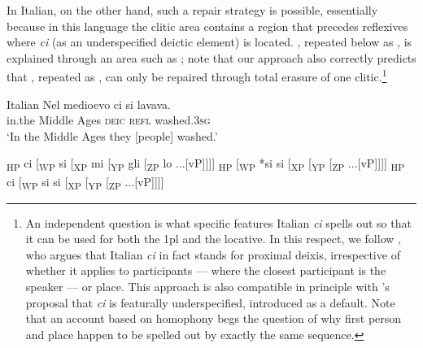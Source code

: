 \documentclass[output=paper,modfonts,nonflat,newtxmath,colorlinks,citecolor=brown]{langsci/langscibook}
\begin{document}
In Italian, on the other hand, such a repair strategy is possible, essentially because in this language the clitic area contains a region that precedes reflexives where \textit{ci} (as an underspecified deictic element) is located. , repeated below as , is explained through an area such as ; note that our approach also correctly predicts that , repeated as , can only be repaired through total erasure of one clitic.\footnote{An independent question is what specific features Italian \textit{ci} spells out so that it can be used for both the 1pl and the locative. In this respect, we follow \citet{Ferrazzano2003}, who argues that Italian \textit{ci} in fact stands for proximal deixis, irrespective of whether it applies to participants — where the closest participant is the speaker — or place. This approach is also compatible in principle with \citeauthor{Pescarini2007}’s proposal that \textit{ci} is featurally underspecified, introduced as a default. Note that an account based on homophony begs the question of why first person and place happen to be spelled out by exactly the same sequence.} 

\ea%
    \label{ex:cabre:26}
     Italian 
    \ex  \label{ex:cabre:26b}
    \gll Nel medioevo  ci  si  lavava. \\
    in.the {Middle Ages}  \textsc{deic} \textsc{refl}  washed.\textsc{3sg}  \\
    \glt  ‘In the Middle Ages they [people] washed.’
    \z
    \z
    

\ea%
    \label{ex:cabre:27}
    \ea {[}\textsubscript{HP}  ci   [\textsubscript{WP}   si  [\textsubscript{XP}  mi  [\textsubscript{YP}  gli  [\textsubscript{ZP} lo  ...[vP]{]]]}
    \ex {[}\textsubscript{HP}     [\textsubscript{WP} *si si  [\textsubscript{XP}    [\textsubscript{YP}    [\textsubscript{ZP}   ...[vP]{]]]}
    \ex  {[}\textsubscript{HP}  ci  [\textsubscript{WP}   si si  [\textsubscript{XP}     [\textsubscript{YP}    [\textsubscript{ZP}   ...[vP]{]]]}
    \z
    \z

\z
\end{document}
